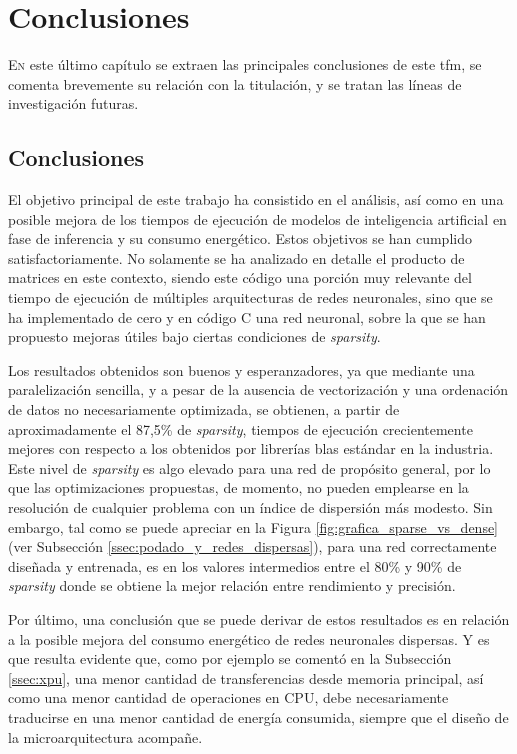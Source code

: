 \chapter{Conclusiones}
\label{chap:conclusiones}

\lettrine{E}{n} este último capítulo se extraen las principales conclusiones de este \acrlong{tfm}, se comenta brevemente su relación con la titulación, y se tratan las líneas de investigación futuras.

\section{Conclusiones}
El objetivo principal de este trabajo ha consistido en el análisis, así como en una posible mejora de los tiempos de ejecución de modelos de inteligencia artificial en fase de inferencia y su consumo energético. Estos objetivos se han cumplido satisfactoriamente. No solamente se ha analizado en detalle el producto de matrices en este contexto, siendo este código una porción muy relevante del tiempo de ejecución de múltiples arquitecturas de redes neuronales, sino que se ha implementado de cero y en código C una red neuronal, sobre la que se han propuesto mejoras útiles bajo ciertas condiciones de \textit{sparsity}.

Los resultados obtenidos son buenos y esperanzadores, ya que mediante una paralelización sencilla, y a pesar de la ausencia de vectorización y una ordenación de datos no necesariamente optimizada, se obtienen, a partir de aproximadamente el 87,5\% de \textit{sparsity}, tiempos de ejecución crecientemente mejores con respecto a los obtenidos por librerías \acrshort{blas} estándar en la industria. Este nivel de \textit{sparsity} es algo elevado para una red de propósito general, por lo que las optimizaciones propuestas, de momento, no pueden emplearse en la resolución de cualquier problema con un índice de dispersión más modesto. Sin embargo, tal como se puede apreciar en la Figura \ref{fig:grafica_sparse_vs_dense} (ver Subsección \ref{ssec:podado_y_redes_dispersas}), para una red correctamente diseñada y entrenada, es en los valores intermedios entre el 80\% y 90\% de \textit{sparsity} donde se obtiene la mejor relación entre rendimiento y precisión.

Por último, una conclusión que se puede derivar de estos resultados es en relación a la posible mejora del consumo energético de redes neuronales dispersas. Y es que resulta evidente que, como por ejemplo se comentó en la Subsección \ref{ssec:xpu}, una menor cantidad de transferencias desde memoria principal, así como una menor cantidad de operaciones en CPU, debe necesariamente traducirse en una menor cantidad de energía consumida, siempre que el diseño de la microarquitectura acompañe.


